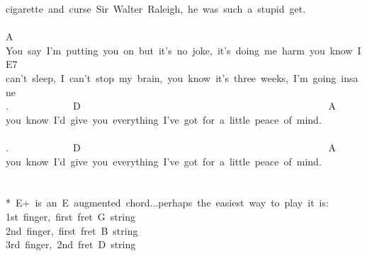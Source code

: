 {cigarette\ and\ curse\ Sir\ Walter\ Raleigh,\ he\ was\ such\ a\ stupid\ get.\\
\\
A\\
You\ say\ I'm\ putting\ you\ on\ but\ it's\ no\ joke,\ it's\ doing\ me\ harm\ you\ know\ I\\
E7\\
can't\ sleep,\ I\ can't\ stop\ my\ brain,\ you\ know\ it's\ three\ weeks,\ I'm\ going\ insane\\
.\ \ \ \ \ \ \ \ \ \ \ \ \ D\ \ \ \ \ \ \ \ \ \ \ \ \ \ \ \ \ \ \ \ \ \ \ \ \ \ \ \ \ \ \ \ \ \ \ \ \ \ \ \ \ \ \ \ \ \ \ \ \ \ A\\
you\ know\ I'd\ give\ you\ everything\ I've\ got\ for\ a\ little\ peace\ of\ mind.\\
\\
.\ \ \ \ \ \ \ \ \ \ \ \ \ D\ \ \ \ \ \ \ \ \ \ \ \ \ \ \ \ \ \ \ \ \ \ \ \ \ \ \ \ \ \ \ \ \ \ \ \ \ \ \ \ \ \ \ \ \ \ \ \ \ \ A\\
you\ know\ I'd\ give\ you\ everything\ I've\ got\ for\ a\ little\ peace\ of\ mind.\\
\\
\\
*\ E+\ is\ an\ E\ augmented\ chord...perhaps\ the\ easiest\ way\ to\ play\ it\ is:\\
1st\ finger,\ first\ fret\ G\ string\\
2nd\ finger,\ first\ fret\ B\ string\\
3rd\ finger,\ 2nd\ fret\ D\ string}
